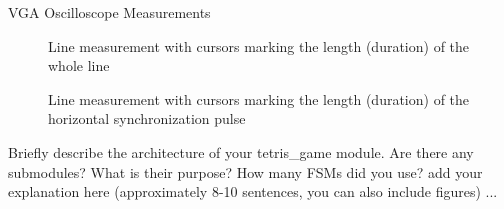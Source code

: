 \documentclass[10pt,a4paper,titlepage,oneside]{article}
\begin{document}
\maketitle



\begin{qa}{VGA Oscilloscope Measurements}

	\begin{figure}[h!]
		\centering
		\dummyimage
		\caption{Line measurement with cursors marking the length (duration) of the whole line}
	\end{figure}
	
	\begin{figure}[h!]
		\centering
		\dummyimage
		\caption{Line measurement with cursors marking the length (duration) of the horizontal synchronization pulse}
	\end{figure}
	

\end{qa}



\begin{qa}{Briefly describe the architecture of your \textsf{tetris\_game} module. Are there any submodules? What is their purpose? How many FSMs did you use?}
add your explanation here (approximately 8-10 sentences, you can also include figures) ... 
\end{qa}

\end{document}
